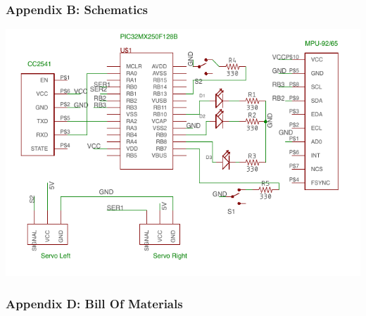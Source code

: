 \documentclass[]{article}
\begin{document}
\hypertarget{appendix-c-schematics}{%
\subsubsection{Appendix B: Schematics}\label{appendix-c-schematics}}

\includegraphics{schematic.png}

\hypertarget{appendix-d-bill-of-materials}{%
\subsubsection{Appendix D: Bill Of
Materials}\label{appendix-d-bill-of-materials}}
\end{document}
